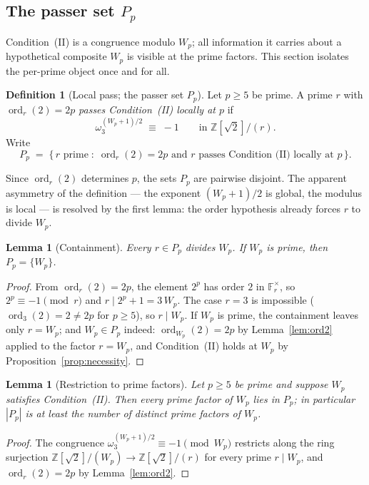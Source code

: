\documentclass[11pt]{amsart}
\theoremstyle{plain}
\newtheorem{lemma}[theorem]{Lemma}
\theoremstyle{definition}
\newtheorem{definition}[theorem]{Definition}
\theoremstyle{remark}
\numberwithin{equation}{section}
\newcommand{\ord}{\operatorname{ord}}
\newcommand{\Z}{\mathbb{Z}}
\newcommand{\F}{\mathbb{F}}
\begin{document}
\subsection{The passer set \texorpdfstring{$P_p$}{Pp}}

Condition~(II) is a congruence modulo $W_p$; all information it carries
about a hypothetical composite $W_p$ is visible at the prime factors.
This section isolates the per-prime object once and for all.

\begin{definition}[Local pass; the passer set $P_p$]\label{def:local-pass}
Let $p \geq 5$ be prime. A prime $r$ with $\ord_r(2) = 2p$ \emph{passes
Condition~(II) locally at $p$} if
\[
  \omega_3^{(W_p+1)/2} \;\equiv\; -1 \qquad \text{in } \Z[\sqrt 2]/(r).
\]
Write
\[
  P_p \;=\; \{\, r \text{ prime} \;:\; \ord_r(2) = 2p \text{ and } r
  \text{ passes Condition~(II) locally at } p \,\}.
\]
\end{definition}

Since $\ord_r(2)$ determines $p$, the sets $P_p$ are pairwise disjoint.
The apparent asymmetry of the definition --- the exponent $(W_p+1)/2$ is
global, the modulus is local --- is resolved by the first lemma: the
order hypothesis already forces $r$ to divide $W_p$.

\begin{lemma}[Containment]\label{lem:pp-containment}
Every $r \in P_p$ divides $W_p$. If $W_p$ is prime, then $P_p = \{W_p\}$.
\end{lemma}

\begin{proof}
From $\ord_r(2) = 2p$, the element $2^p$ has order $2$ in $\F_r^\times$,
so $2^p \equiv -1 \pmod r$ and $r \mid 2^p + 1 = 3\,W_p$. The case
$r = 3$ is impossible ($\ord_3(2) = 2 \neq 2p$ for $p \geq 5$), so
$r \mid W_p$. If $W_p$ is prime, the containment leaves only $r = W_p$;
and $W_p \in P_p$ indeed: $\ord_{W_p}(2) = 2p$ by Lemma~\ref{lem:ord2}
applied to the factor $r = W_p$, and Condition~(II) holds at $W_p$ by
Proposition~\ref{prop:necessity}.
\end{proof}

\begin{lemma}[Restriction to prime factors]\label{lem:restriction}
Let $p \geq 5$ be prime and suppose $W_p$ satisfies Condition~(II). Then
every prime factor of $W_p$ lies in $P_p$; in particular $|P_p|$ is at
least the number of distinct prime factors of $W_p$.
\end{lemma}

\begin{proof}
The congruence $\omega_3^{(W_p+1)/2} \equiv -1 \pmod{W_p}$ restricts
along the ring surjection $\Z[\sqrt 2]/(W_p) \to \Z[\sqrt 2]/(r)$ for
every prime $r \mid W_p$, and $\ord_r(2) = 2p$ by Lemma~\ref{lem:ord2}.
\end{proof}
\end{document}
